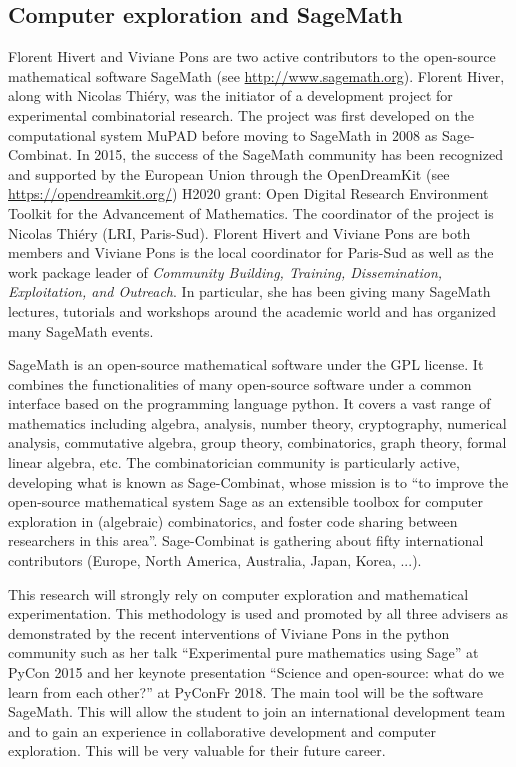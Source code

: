 \documentclass[a4paper,12pt]{article}
\begin{document}
\subsection{Computer exploration and SageMath}

Florent Hivert and Viviane Pons are two active contributors to the open-source mathematical software SageMath (see \url{http://www.sagemath.org}). Florent Hiver, along with Nicolas Thiéry, was the initiator of a development project for experimental combinatorial research. The project was first developed on the computational system MuPAD before moving to SageMath in 2008 as Sage-Combinat. In 2015, the success of the SageMath community has been recognized and supported by the European Union through the OpenDreamKit (see \url{https://opendreamkit.org/}) H2020 grant: Open Digital Research Environment Toolkit for the Advancement of Mathematics. The coordinator of the project is Nicolas Thiéry (LRI, Paris-Sud). Florent Hivert and Viviane Pons are both members and Viviane Pons is the local coordinator for Paris-Sud as well as the work package leader of \emph{Community Building, Training, Dissemination, Exploitation, and Outreach}. In particular, she has been giving many SageMath lectures, tutorials and workshops around the academic world and has organized many SageMath events.

SageMath is an open-source mathematical software under the GPL license. It combines the functionalities of many open-source software under a common interface based on the programming language python. It covers a vast range of mathematics including algebra, analysis, number theory, cryptography, numerical analysis, commutative algebra, group theory, combinatorics, graph theory, formal linear algebra, etc. The combinatorician community is particularly active, developing what is known as Sage-Combinat, whose mission is to ``to improve the open-source mathematical system Sage as an extensible toolbox for computer exploration in (algebraic) combinatorics, and foster code sharing between researchers in this area''. Sage-Combinat is gathering about fifty international contributors (Europe, North America, Australia, Japan, Korea, ...).

This research will strongly rely on computer exploration and mathematical experimentation. This methodology is used and promoted by all three advisers as demonstrated by the recent interventions of Viviane Pons in the python community such as her talk ``Experimental pure mathematics using Sage'' at PyCon 2015 and her keynote presentation ``Science and open-source: what do we learn from each other?'' at PyConFr 2018. The main tool will be the software SageMath. This will allow the student to join an international development team and to gain an experience in collaborative development and computer exploration. This will be very valuable for their future career. 
\end{document}
